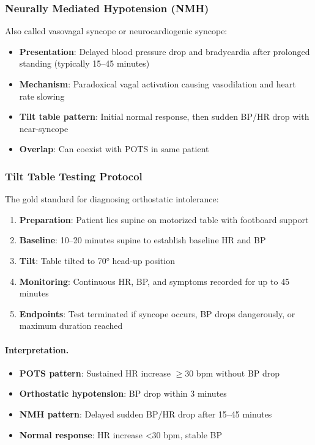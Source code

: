 \subsubsection{Neurally Mediated Hypotension (NMH)}

Also called vasovagal syncope or neurocardiogenic syncope:
\begin{itemize}
    \item \textbf{Presentation}: Delayed blood pressure drop and bradycardia after prolonged standing (typically 15--45 minutes)
    \item \textbf{Mechanism}: Paradoxical vagal activation causing vasodilation and heart rate slowing
    \item \textbf{Tilt table pattern}: Initial normal response, then sudden BP/HR drop with near-syncope
    \item \textbf{Overlap}: Can coexist with POTS in same patient
\end{itemize}

\subsubsection{Tilt Table Testing Protocol}

The gold standard for diagnosing orthostatic intolerance:

\begin{enumerate}
    \item \textbf{Preparation}: Patient lies supine on motorized table with footboard support
    \item \textbf{Baseline}: 10--20 minutes supine to establish baseline HR and BP
    \item \textbf{Tilt}: Table tilted to 70° head-up position
    \item \textbf{Monitoring}: Continuous HR, BP, and symptoms recorded for up to 45 minutes
    \item \textbf{Endpoints}: Test terminated if syncope occurs, BP drops dangerously, or maximum duration reached
\end{enumerate}

\paragraph{Interpretation.}
\begin{itemize}
    \item \textbf{POTS pattern}: Sustained HR increase $\geq$30 bpm without BP drop
    \item \textbf{Orthostatic hypotension}: BP drop within 3 minutes
    \item \textbf{NMH pattern}: Delayed sudden BP/HR drop after 15--45 minutes
    \item \textbf{Normal response}: HR increase <30 bpm, stable BP
\end{itemize}

